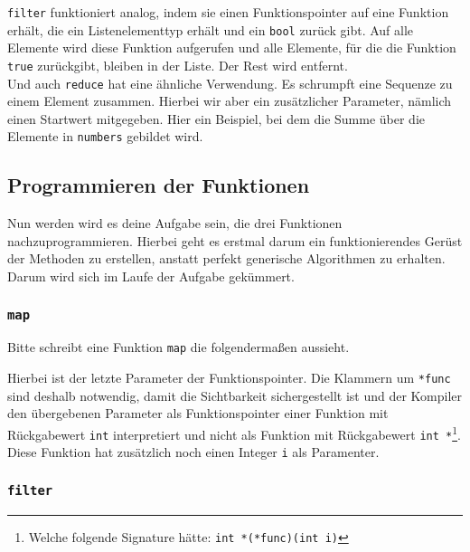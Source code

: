 \lstinline{filter} funktioniert analog, indem sie einen Funktionspointer auf eine Funktion erhält, die ein Listenelementtyp erhält und ein \lstinline{bool} zurück gibt.
Auf alle Elemente wird diese Funktion aufgerufen und alle Elemente, für die die Funktion \lstinline{true} zurückgibt, bleiben in der Liste. Der Rest wird entfernt. \\



Und auch \lstinline{reduce} hat eine ähnliche Verwendung.
Es schrumpft eine Sequenze zu einem Element zusammen.
Hierbei wir aber ein zusätzlicher Parameter, nämlich einen Startwert mitgegeben.
Hier ein Beispiel, bei dem die Summe über die Elemente in \lstinline{numbers} gebildet wird.



\subsection{Programmieren der Funktionen}
\label{sec:map-filter-reduce-basic-impl}

Nun werden wird es deine Aufgabe sein, die drei Funktionen nachzuprogrammieren.
Hierbei geht es erstmal darum ein funktionierendes Gerüst der Methoden zu erstellen, anstatt perfekt generische Algorithmen zu erhalten.
Darum wird sich im Laufe der Aufgabe gekümmert.

\subsubsection{\lstinline{map}}

Bitte schreibt eine Funktion \lstinline{map} die folgendermaßen aussieht.



Hierbei ist der letzte Parameter der Funktionspointer.
Die Klammern um \lstinline{*func} sind deshalb notwendig, damit die Sichtbarkeit sichergestellt ist und der Kompiler den übergebenen Parameter als Funktionspointer einer Funktion mit Rückgabewert \lstinline{int} interpretiert und nicht als Funktion mit Rückgabewert \lstinline{int *}\footnote{Welche folgende Signature hätte: \lstinline{int *(*func)(int i)}}.
Diese Funktion hat zusätzlich noch einen Integer \lstinline{i} als Paramenter.

\subsubsection{\lstinline{filter}}

